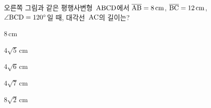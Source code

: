 \noindent\begin{minipage}[t]{0.58\linewidth}\vspace{0pt}\raggedright 오른쪽 그림과 같은 평행사변형~$\mathrm{ABCD}$에서 $\overline{\mathrm{AB}}=8\,\mathrm{cm}$, $\overline{\mathrm{BC}}=12\,\mathrm{cm}$, $\angle\mathrm{BCD}=120^\circ$일 때, 대각선~$\mathrm{AC}$의 길이는?\end{minipage}\hfill\begin{minipage}[t]{0.4\linewidth}\vspace{0pt}\centering \resizebox{\ifdim\width>\linewidth\linewidth\else\width\fi}{!}{}\end{minipage}\par
\begin{choices32}{\rule[-3ex]{0pt}{8ex}$8\,\mathrm{cm}$}{\rule[-3ex]{0pt}{8ex}$4\sqrt{5}\,\mathrm{cm}$}{\rule[-3ex]{0pt}{8ex}$4\sqrt{6}\,\mathrm{cm}$}{\rule[-3ex]{0pt}{8ex}$4\sqrt{7}\,\mathrm{cm}$}{\rule[-3ex]{0pt}{8ex}$8\sqrt{2}\,\mathrm{cm}$}\end{choices32}
